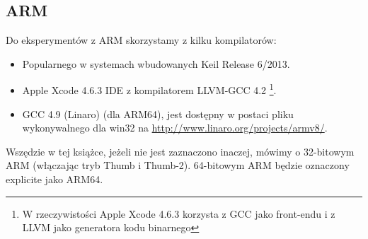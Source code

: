 \subsection{ARM}
\label{sec:hw_ARM}

\myindex{\idevices}
Do eksperymentów z ARM skorzystamy z kilku kompilatorów:

\begin{itemize}
\item Popularnego w systemach wbudowanych Keil Release 6/2013.

\item Apple Xcode 4.6.3 IDE z kompilatorem LLVM-GCC 4.2
\footnote{W rzeczywistości Apple Xcode 4.6.3 korzysta z GCC jako front-endu i z LLVM jako generatora kodu binarnego}.

\item GCC 4.9 (Linaro) (dla ARM64), 
jest dostępny w postaci pliku wykonywalnego dla win32 na \url{http://www.linaro.org/projects/armv8/}.

\end{itemize}

Wszędzie w tej książce, jeżeli nie jest zaznaczono inaczej, mówimy o 32-bitowym ARM (włączając tryb Thumb i Thumb-2).
64-bitowym ARM będzie oznaczony explicite jako ARM64.








